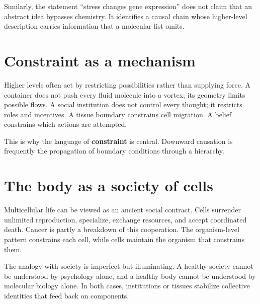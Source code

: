 Similarly, the statement ``stress changes gene expression'' does not claim that an abstract idea bypasses chemistry. It identifies a causal chain whose higher-level description carries information that a molecular list omits.

\section{Constraint as a mechanism}\label{constraint-as-a-mechanism}

Higher levels often act by restricting possibilities rather than supplying force. A container does not push every fluid molecule into a vortex; its geometry limits possible flows. A social institution does not control every thought; it restricts roles and incentives. A tissue boundary constrains cell migration. A belief constrains which actions are attempted.

This is why the language of \textbf{constraint} is central. Downward causation is frequently the propagation of boundary conditions through a hierarchy.

\section{The body as a society of cells}\label{the-body-as-a-society-of-cells}

Multicellular life can be viewed as an ancient social contract. Cells surrender unlimited reproduction, specialize, exchange resources, and accept coordinated death. Cancer is partly a breakdown of this cooperation. The organism-level pattern constrains each cell, while cells maintain the organism that constrains them.

The analogy with society is imperfect but illuminating. A healthy society cannot be understood by psychology alone, and a healthy body cannot be understood by molecular biology alone. In both cases, institutions or tissues stabilize collective identities that feed back on components.
